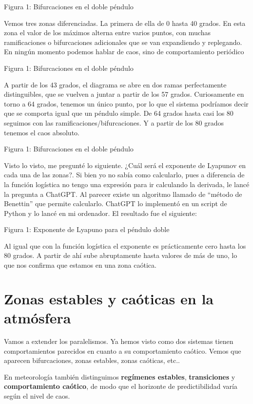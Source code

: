 \documentclass[
  10pt,
  a4paper,
  DIV=11,
  numbers=noendperiod,
  open=any]{scrreprt}
\numberwithin{equation}{chapter}
\numberwithin{equation}{section}
\renewcommand{\[}{\begin{equation}}
\renewcommand{\]}{\end{equation}}
\begin{document}
Figura 1: Bifurcaciones en el doble péndulo

Vemos tres zonas diferenciadas. La primera de ella de 0 hasta 40 grados.
En esta zona el valor de los máximos alterna entre varios puntos, con
muchas ramificaciones o bifurcaciones adicionales que se van expandiendo
y replegando. En ningún momento podemos hablar de caos, sino de
comportamiento periódico

Figura 1: Bifurcaciones en el doble péndulo

A partir de los 43 grados, el diagrama se abre en dos ramas
perfectamente distinguibles, que se vuelven a juntar a partir de los 57
grados. Curiosamente en torno a 64 grados, tenemos un único punto, por
lo que el sistema podríamos decir que se comporta igual que un péndulo
simple. De 64 grados hasta casi los 80 seguimos con las
ramificaciones/bifurcaciones. Y a partir de los 80 grados tenemos el
caos absoluto.

Figura 1: Bifurcaciones en el doble péndulo

Visto lo visto, me pregunté lo siguiente. ¿Cuál será el exponente de
Lyapunov en cada una de las zonas?. Si bien yo no sabía como calcularlo,
pues a diferencia de la función logística no tengo una expresión para ir
calculando la derivada, le lancé la pregunta a ChatGPT. Al parecer
existe un algoritmo llamado de ``método de Benettin'' que permite
calcularlo. ChatGPT lo implementó en un script de Python y lo lancé en
mi ordenador. El resultado fue el siguiente:

Figura 1: Exponente de Lyapuno para el péndulo doble

Al igual que con la función logística el exponente es prácticamente cero
hasta los 80 grados. A partir de ahí sube abruptamente hasta valores de
más de uno, lo que nos confirma que estamos en una zona caótica.

\section{Zonas estables y caóticas en la
atmósfera}\label{zonas-estables-y-cauxf3ticas-en-la-atmuxf3sfera}

Vamos a extender los paralelismos. Ya hemos visto como dos sistemas
tienen comportamientos parecidos en cuanto a su comportamiento caótico.
Vemos que aparecen bifurcaciones, zonas estables, zonas caóticas, etc..

En meteorología también distinguimos \textbf{regímenes estables},
\textbf{transiciones} y \textbf{comportamiento caótico}, de modo que el
horizonte de predictibilidad varía según el nivel de caos.
\end{document}
